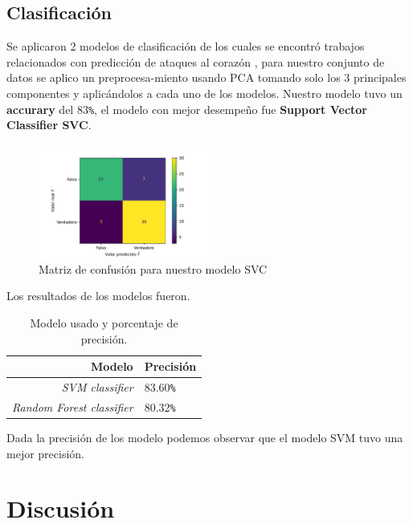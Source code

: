 \documentclass[10pt,journal]{IEEEtran}
\begin{document}
\subsection{Clasificación}

Se aplicaron 2 modelos de clasificación de los cuales se encontró trabajos relacionados con predicción de ataques al corazón \cite{Pal_2021} \cite{8684835}, para nuestro conjunto de datos se aplico un preprocesa-miento usando PCA tomando solo los 3 principales componentes y aplicándolos a cada uno de los modelos. Nuestro modelo tuvo un \textbf{accurary} del 83\verb|%|, el modelo con mejor desempeño fue \textbf{Support Vector Classifier SVC}.

\begin{figure}[ht]
    \centering
    \includegraphics[width=0.5\textwidth,height=0.5\textheight,keepaspectratio]{cfm.pdf}
    \caption{ Matriz de confusión para nuestro modelo SVC} 
    \label{fig:fcm_matriz}
\end{figure}


Los resultados de los modelos fueron.

\begin{table}[th]
    \caption{Modelo usado y porcentaje de precisión.}
    \label{tab:ts_example}
    \begin{center}
    \begin{tabular}{|r|l|}
    \hline
       Modelo & Precisión  \\
   \hline
    \emph{SVM classifier} &  83.60\verb|%|  \\

    \hline
    \emph{Random Forest classifier} &  80.32\verb|%|  \\
   \hline
    \end{tabular}
    \end{center}
\end{table}

Dada la precisión de los modelo podemos observar que el modelo SVM tuvo una mejor precisión.



\section{Discusión}
\end{document}
